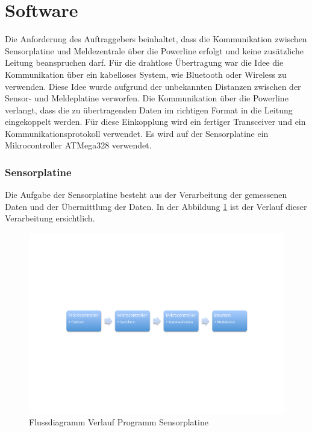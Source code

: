 %
%
%

\section{Software}
Die Anforderung des Auftraggebers beinhaltet, dass die Kommunikation zwischen Sensorplatine und Meldezentrale über die Powerline erfolgt und keine zusätzliche Leitung beanspruchen darf. Für die drahtlose Übertragung war die Idee die Kommunikation über ein kabelloses System, wie Bluetooth oder Wireless zu verwenden. Diese Idee wurde aufgrund der unbekannten Distanzen zwischen der Sensor- und Meldeplatine verworfen. Die Kommunikation über die Powerline verlangt, dass die zu übertragenden Daten im richtigen Format in die Leitung eingekoppelt werden. Für diese Einkopplung wird ein fertiger Transceiver und ein Kommunikationsprotokoll verwendet. Es wird auf der Sensorplatine ein Mikrocontroller ATMega328 verwendet. 


\subsubsection{Sensorplatine}
Die Aufgabe der Sensorplatine besteht aus der Verarbeitung der gemessenen Daten und der Übermittlung der Daten. In der Abbildung \ref{fig:Software_Flussdiagramm_Sensorplatine} ist der Verlauf dieser Verarbeitung ersichtlich.

\begin{figure}[htbp] 
  \centering
     \includegraphics[width=1\textwidth]{graphics/Software_Flussdiagramm_Sensorplatine}
  \caption{Flussdiagramm Verlauf Programm Sensorplatine}
  \label{fig:Software_Flussdiagramm_Sensorplatine}
\end{figure}

